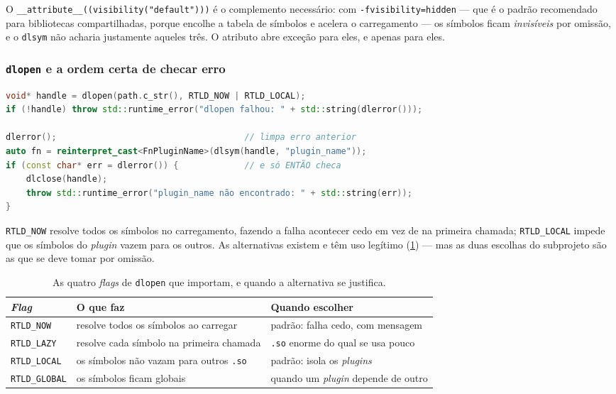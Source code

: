 O \texttt{\_\_attribute\_\_((visibility("default")))} é o complemento
necessário: com \texttt{-fvisibility=hidden} --- que é o padrão recomendado
para bibliotecas compartilhadas, porque encolhe a tabela de símbolos e acelera o
carregamento --- os símbolos ficam \emph{invisíveis} por omissão, e o
\texttt{dlsym} não acharia justamente aqueles três. O atributo abre exceção
para eles, e apenas para eles.

\subsubsection{\texttt{dlopen} e a ordem certa de checar erro}

\begin{lstlisting}[style=bt, language=C++,
    caption={As flags, e o motivo de \texttt{dlerror()} vir antes.}]
void* handle = dlopen(path.c_str(), RTLD_NOW | RTLD_LOCAL);
if (!handle) throw std::runtime_error("dlopen falhou: " + std::string(dlerror()));

dlerror();                                     // limpa erro anterior
auto fn = reinterpret_cast<FnPluginName>(dlsym(handle, "plugin_name"));
if (const char* err = dlerror()) {             // e só ENTÃO checa
    dlclose(handle);
    throw std::runtime_error("plugin_name não encontrado: " + std::string(err));
}
\end{lstlisting}

\texttt{RTLD\_NOW} resolve todos os símbolos no carregamento, fazendo a falha
acontecer cedo em vez de na primeira chamada; \texttt{RTLD\_LOCAL} impede que os
símbolos do \emph{plugin} vazem para os outros. As alternativas existem e têm
uso legítimo (\cref{tab:rtld}) --- mas as duas escolhas do subprojeto são as
que se deve tomar por omissão.

\begin{table}[htbp]
\centering
\caption{As quatro \emph{flags} de \texttt{dlopen} que importam, e quando a
         alternativa se justifica.}
\label{tab:rtld}
\footnotesize
\begin{tabular}{@{}lp{}p{}@{}}
\toprule
\textbf{\emph{Flag}} & \textbf{O que faz} & \textbf{Quando escolher} \\
\midrule
\texttt{RTLD\_NOW}   & resolve todos os símbolos ao carregar & padrão: falha cedo, com mensagem \\
\texttt{RTLD\_LAZY}  & resolve cada símbolo na primeira chamada & \texttt{.so} enorme do qual se usa pouco \\
\texttt{RTLD\_LOCAL} & os símbolos não vazam para outros \texttt{.so} & padrão: isola os \emph{plugins} \\
\texttt{RTLD\_GLOBAL}& os símbolos ficam globais & quando um \emph{plugin} depende de outro \\
\bottomrule
\end{tabular}
\end{table}

